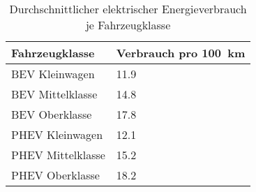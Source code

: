 {
\renewcommand{\arraystretch}{1.2}%
\begin{table}[H]
	\begin{center}
		\caption{Durchschnittlicher elektrischer Energieverbrauch je Fahrzeugklasse}
		\begin{tabu} to 0.5\textwidth {X[1] X[1.2, r]}
			\toprule
			Fahrzeugklasse    & Verbrauch pro \SI{100}{\km} \\ \midrule
			BEV Kleinwagen    & \SI{11.9}{\kwh}              \\
			BEV Mittelklasse  & \SI{14.8}{\kwh}              \\
			BEV Oberklasse    & \SI{17.8}{\kwh}              \\
			PHEV Kleinwagen   & \SI{12.1}{\kwh}              \\
			PHEV Mittelklasse & \SI{15.2}{\kwh}              \\
			PHEV Oberklasse   & \SI{18.2}{\kwh}              \\ \bottomrule
		\end{tabu}
		\label{tab:TechVerbrauch}
	\end{center}
	\vspace{-3mm}%
\end{table}
}